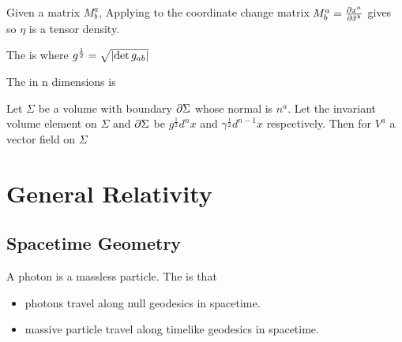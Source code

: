 \documentclass{article}
\begin{document}
\begin{lemma}
Given a matrix $M^a_b$, 
Applying to the coordinate change matrix $M^a_b = \pd[x^a]{\tilde{x}^b}$ gives 
so $\eta$ is a tensor density. 
\end{lemma}

\begin{definition}
The  is 
where $g^\frac{1}{2} = \sqrt{\abs{\det g_{ab}}}$
\end{definition}

\begin{definition}
The  in n dimensions is  
\end{definition}

\begin{theorem}
Let $\Sigma$ be a volume with boundary $\del \Sigma$ whose normal is $n^a$. Let the invariant volume element on $\Sigma$ and $\del \Sigma$ be $g^\frac{1}{2} d^n x $ and $\gamma^\frac{1}{2} d^{n-1}x$ respectively. Then for $V^a$ a vector field on $\Sigma$ 
\end{theorem}


\section{General Relativity}
\subsection{Spacetime Geometry}

\begin{definition}
A photon is a massless particle. The  is that 
\begin{itemize}
    \item photons travel along null geodesics in spacetime. 
    \item massive particle travel along timelike geodesics in spacetime.
\end{itemize}
\end{definition}
\end{document}

